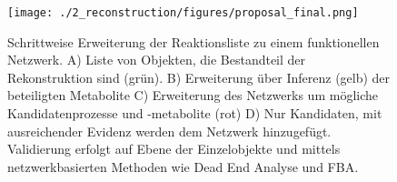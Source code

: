 \begin{landscape}
\begin{figure}[htp]
 \centering
 \texttt{[image: ./2\_reconstruction/figures/proposal\_final.png]}
\caption{Schrittweise Erweiterung der Reaktionsliste zu einem funktionellen Netzwerk. A) Liste von Objekten, die Bestandteil der Rekonstruktion sind (grün). B) Erweiterung über Inferenz (gelb) der beteiligten Metabolite  C) Erweiterung des Netzwerks um mögliche Kandidatenprozesse und -metabolite (rot) D) Nur Kandidaten, mit ausreichender Evidenz werden dem Netzwerk hinzugefügt. Validierung erfolgt auf Ebene der Einzelobjekte und mittels netzwerkbasierten Methoden wie Dead End Analyse und FBA.}
\label{fig: proposal}
\end{figure}
\end{landscape}

